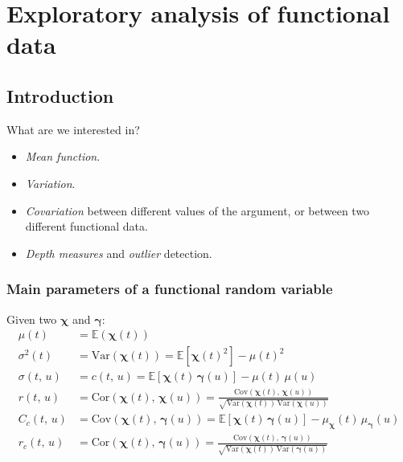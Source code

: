 \chapter{Exploratory analysis of functional data}

\section{Introduction}
\begin{question}{What are we interested in?}{}
	\begin{itemize}
		\item \emph{Mean function}.
		\item \emph{Variation}.
		\item \emph{Covariation} between different values of the argument,
		      or between two different functional data.
		\item \emph{Depth measures} and \emph{outlier} detection.
	\end{itemize}
\end{question}

\subsection{Main parameters of a functional random variable}

\newcommand{\X}{{\boldsymbol{\chi}}}
\newcommand{\Y}{{\boldsymbol{\gamma}}}
Given two  $\X$ and $\Y$:
\begin{align*}
	\mu(t)        & = \mathds E(\X(t)) \tag{Mean function}                                                                                                       \\
	\sigma^2(t)   & = \text{Var}(\X(t)) = \mathds E\left[
		\X(t)^2
	\right] - \mu(t)^2 \tag{Variance function}                                                                                                                   \\
	\sigma(t,\,u) & = c(t,\,u) = \mathds E\left[
		\X(t)\,\Y(u)
	\right] - \mu(t)\,\mu(u) \tag{Covariance function}                                                                                                           \\
	r(t,\,u)      & = \text{Cor}(\X(t),\,\X(u)) =
	\frac{\text{Cov}(\X(t),\,\X(u))}{\sqrt{\text{Var}(\X(t))\,\text{Var}(\X(u))}}
	\tag{Correlation function}                                                                                                                                   \\
	C_c(t,\,u)    & = \text{Cov}(\X(t),\,\Y(u)) = \mathds E\left[ \X(t)\,\Y(u) \right] - \mu_\X(t)\,\mu_\Y(u) \tag{Cross-covariance function}                    \\
	r_c(t,\,u)    & = \text{Cor}(\X(t),\,\Y(u)) = \frac{\text{Cov}(\X(t),\,\Y(u))}{\sqrt{\text{Var}(\X(t))\,\text{Var}(\Y(u))}} \tag{Cross-correlation function}
\end{align*}

